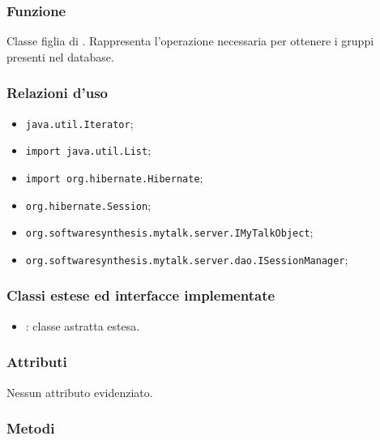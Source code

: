 
\subsubsection*{Funzione}
Classe figlia di . Rappresenta l'operazione necessaria per ottenere i gruppi presenti nel database.

\subsubsection*{Relazioni d'uso}

\begin{itemize}
		\item \texttt{java.util.Iterator};
		\item \texttt{import java.util.List};
		\item \texttt{import org.hibernate.Hibernate};
		\item \texttt{org.hibernate.Session};
		\item \texttt{org.softwaresynthesis.mytalk.server.IMyTalkObject};
		\item \texttt{org.softwaresynthesis.mytalk.server.dao.ISessionManager};
\end{itemize}

\subsubsection*{Classi estese ed interfacce implementate}

\begin{itemize}
	\item {}: classe astratta estesa.
\end{itemize}

\subsubsection*{Attributi}

Nessun attributo evidenziato.

\subsubsection*{Metodi}

